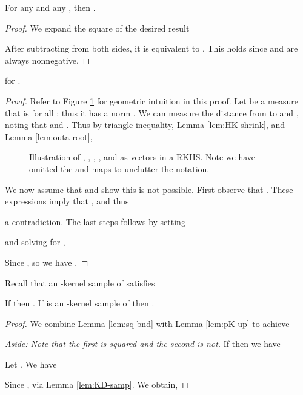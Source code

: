 \documentclass[11pt]{myclass}
\begin{document}
\begin{lemma}
\label{lem:outa-root}
For any  and any , then .
\end{lemma}
\begin{proof}
We expand the square of the desired result

After subtracting  from both sides, it is equivalent to .  This holds since  and  are always nonnegative.  
\end{proof}


\begin{lemma}
\label{lem:sq-bnd}
 for . 
\end{lemma}
\begin{proof}
Refer to Figure \ref{fig:kern-pow} for geometric intuition in this proof.  
Let  be a measure that is  for all ; thus it has a norm .  
We can measure the distance from  to  and , noting that  and .  Thus by triangle inequality, Lemma \ref{lem:HK-shrink}, and Lemma \ref{lem:outa-root},   




\begin{figure}
\vspace{-5mm}
\caption{\label{fig:kern-pow}
\small \sffamily 
Illustration of , , , , and  as vectors in a RKHS.  Note we have omitted the  and  maps to unclutter the notation.  
}
\end{figure}

We now assume that  and show this is not possible.  
First observe that .  
These expressions imply that , and thus 

a contradiction.  
The last steps follows by setting 

and solving for , 

Since , so we have .  
\end{proof}


Recall that an -kernel sample  of  satisfies



\begin{theorem}
\label{thm:powK-up-eh}
If  then . 
If  is an -kernel sample of  then 
.  
\end{theorem}
\begin{proof}
We combine Lemma \ref{lem:sq-bnd} with Lemma \ref{lem:pK-up} to achieve

\emph{Aside:  Note that the first  is squared and the second is not.}
If  then  we have

Let .  We have 


Since , via Lemma \ref{lem:KD-samp}. 
We obtain, 

\end{proof}
\end{document}

